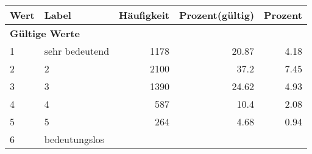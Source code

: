      \begin{longtable}{lXrrr}
     \toprule
     \textbf{Wert} & \textbf{Label} & \textbf{Häufigkeit} & \textbf{Prozent(gültig)} & \textbf{Prozent} \\
     \endhead
     \midrule
     \multicolumn{5}{l}{\textbf{Gültige Werte}}\\

     1 &
     \multicolumn{1}{X}{ sehr bedeutend   } &


       \num{1178} &
       \num[round-mode=places,round-precision=2]{20.87} &
         \num[round-mode=places,round-precision=2]{4.18} \\

     2 &
     \multicolumn{1}{X}{ 2   } &


       \num{2100} &
       \num[round-mode=places,round-precision=2]{37.2} &
         \num[round-mode=places,round-precision=2]{7.45} \\

     3 &
     \multicolumn{1}{X}{ 3   } &


       \num{1390} &
       \num[round-mode=places,round-precision=2]{24.62} &
         \num[round-mode=places,round-precision=2]{4.93} \\

     4 &
     \multicolumn{1}{X}{ 4   } &


       \num{587} &
       \num[round-mode=places,round-precision=2]{10.4} &
         \num[round-mode=places,round-precision=2]{2.08} \\

     5 &
     \multicolumn{1}{X}{ 5   } &


       \num{264} &
       \num[round-mode=places,round-precision=2]{4.68} &
         \num[round-mode=places,round-precision=2]{0.94} \\

     6 &
     \multicolumn{1}{X}{ bedeutungslos   } &



\end{longtable}
